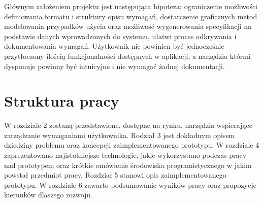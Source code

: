       Głównym założeniem projektu jest następująca hipoteza: ograniczenie możliwości definiowania formatu i struktury opisu wymagań, dostarczenie graficznych metod modelowania przypadków użycia oraz możliwość wygenerowania specyfikacji na podstawie danych wprowadzonych do systemu, ułatwi proces odkrywania i dokumentowania wymagań. Użytkownik nie powinien być jednocześnie przytłoczony ilością funkcjonalności dostępnych w aplikacji, a narzędzia którmi dysponuje powinny być intuicyjne i nie wymagać żadnej dokumentacji. 


    \section{Struktura pracy}

      W rozdziale 2 zostaną przedstawione, dostępne na rynku, narzędzia wspierające zarządzanie wymaganiami użytkownika. Rodział 3 jest dokładnym opisem dziedziny problemu oraz koncepcji zaimplementowanego prototypu. W rozdziale 4 zaprezentowano najistotniejsze technologie, jakie wykorzystano podczas pracy nad prototypem oraz krótkie omówienie środowiska programistycznego w jakim powstał przedmiot pracy. Rozdział 5 stanowi opis zaimplementowanego prototypu. W rozdziale 6 zawarto podsumowanie wyników pracy oraz propozycje kierunków dlaszego rozwoju. 
